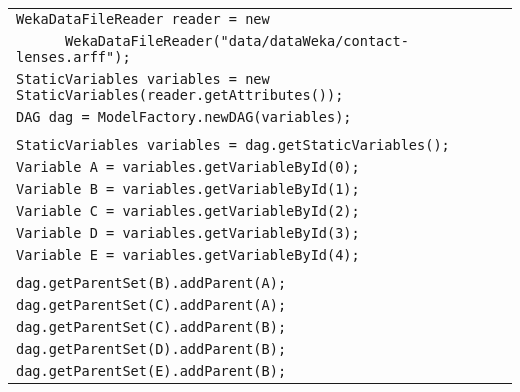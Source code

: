 \begin{table}[H]
\begin{tabular}{l} \hline

        \texttt{WekaDataFileReader reader = new}\\
         \texttt{~~~~~~WekaDataFileReader("data/dataWeka/contact-lenses.arff");}\\

        \texttt{StaticVariables variables = new StaticVariables(reader.getAttributes());}\\
        \texttt{DAG dag = ModelFactory.newDAG(variables);}\\\\

        \texttt{StaticVariables variables = dag.getStaticVariables();}\\
        \texttt{Variable A = variables.getVariableById(0);}\\
        \texttt{Variable B = variables.getVariableById(1);}\\
        \texttt{Variable C = variables.getVariableById(2);}\\
        \texttt{Variable D = variables.getVariableById(3);}\\ 
        \texttt{Variable E = variables.getVariableById(4);}\\ \\         


        \texttt{dag.getParentSet(B).addParent(A);}\\
        \texttt{dag.getParentSet(C).addParent(A);}\\
        \texttt{dag.getParentSet(C).addParent(B);}\\
        \texttt{dag.getParentSet(D).addParent(B);}\\
        \texttt{dag.getParentSet(E).addParent(B);}\\\hline 

\end{tabular}
\end{table}